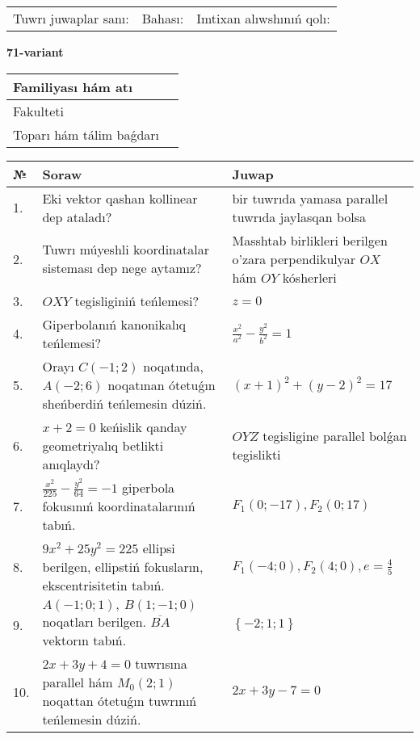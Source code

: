 \documentclass{article}
\begin{document}
\vspace{1cm}

\begin{tabular}{lll}
Tuwrı juwaplar sanı: \underline{\hspace{1.5cm}} & 
Bahası: \underline{\hspace{1.5cm}} & 
Imtixan alıwshınıń qolı: \underline{\hspace{2cm}} \\
\end{tabular}

\egroup

\newpage


\textbf{71-variant}\\

\bgroup
\def\arraystretch{1.6} %

\begin{tabular}{|m{5.7cm}|m{9.5cm}|}
\hline
Familiyası hám atı & \\
\hline
Fakulteti  & \\
\hline
Toparı hám tálim baǵdarı  & \\
\hline
\end{tabular}

\vspace{1cm}

\begin{tabular}{|m{0.7cm}|m{10cm}|m{4cm}|}
\hline
№ & Soraw & Juwap \\
\hline
1. & Eki vektor qashan kollinear dep ataladı? & bir tuwrıda yamasa parallel tuwrıda jaylasqan bolsa \\
\hline
2. & Tuwrı múyeshli koordinatalar sisteması dep nege aytamız? & Masshtab birlikleri berilgen o'zara perpendikulyar $OX$ hám $OY$ kósherleri \\
\hline
3. & $OXY$ tegisliginiń teńlemesi? & $z=0$ \\
\hline
4. & Giperbolanıń kanonikalıq teńlemesi? & $\frac{x^2}{a^2}-\frac{y^2}{b^2}=1$ \\
\hline
5. & Orayı $C (-1;2)$ noqatında, $A (-2;6 )$ noqatınan ótetuǵın sheńberdiń teńlemesin dúziń. & $(x+1)^{2}+(y-2)^{2}=17$ \\
\hline
6. & $x+2=0$ keńislik qanday geometriyalıq betlikti anıqlaydı? &  $OYZ$ tegisligine parallel bolǵan tegislikti \\
\hline
7. & $\frac{x^{2}}{225}-\frac{y^{2}}{64}=-1$ giperbola fokusınıń koordinatalarınıń tabıń. & $F_{1}(0;-17), F_{2}(0;17)$ \\
\hline
8. & $9x^{2}+25y^{2}=225$ ellipsi berilgen, ellipstiń fokusların, ekscentrisitetin tabıń. & $F_1\left(-4;0 \right) , F_2\left( 4;0 \right) , e = \frac{4}{5}$ \\
\hline
9. & $A (-1;0;1),\ B (1;-1;0)$ noqatları berilgen. $\overline{BA}$ vektorın tabıń. & $\left\{ - 2;1;1 \right\}$ \\
\hline
10. & $2x+3y+4=0$ tuwrısına parallel hám $M_{0} (2;1)$ noqattan ótetuǵın tuwrınıń teńlemesin dúziń. & $2x+3y-7=0$ \\
\hline
\end{tabular}
\end{document}
